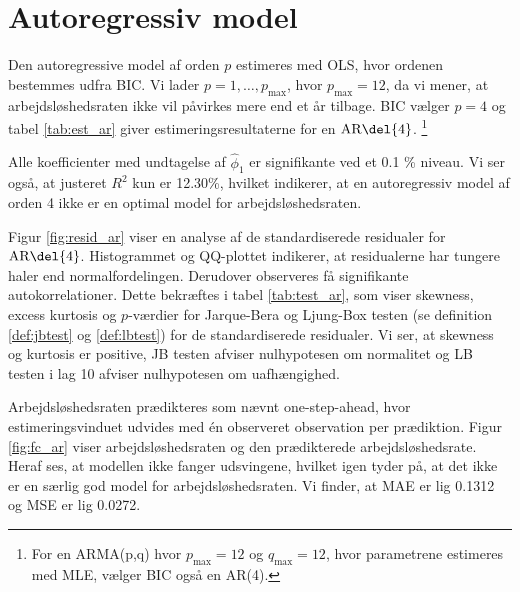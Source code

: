 \section{Autoregressiv model}
Den autoregressive model af orden \(p\) estimeres med OLS, hvor ordenen bestemmes udfra BIC.
Vi lader $p = 1, \ldots, p_{\max}$, hvor \(p_\text{max}=12\), da vi mener, at arbejdsløshedsraten ikke vil påvirkes mere end et år tilbage.
BIC vælger \(p=4\) og tabel \ref{tab:est_ar} giver estimeringsresultaterne for en \(\text{AR} \del{4}\). \footnote{For en ARMA(p,q) hvor $p_{\max} = 12$ og $q_{\max} = 12$, hvor parametrene estimeres med MLE, vælger BIC også en AR(4).}
%


Alle koefficienter med undtagelse af $\widehat\phi_1$ er signifikante ved et 0.1 \% niveau. 
Vi ser også, at justeret $R^2$ kun er 12.30\%, hvilket indikerer, at en autoregressiv model af orden 4 ikke er en optimal model for arbejdsløshedsraten. 



Figur \ref{fig:resid_ar} viser en analyse af de standardiserede residualer for \(\text{AR} \del{4}\). 
Histogrammet og QQ-plottet indikerer, at residualerne har tungere haler end normalfordelingen. 
Derudover observeres få signifikante autokorrelationer.
Dette bekræftes i tabel \ref{tab:test_ar}, som viser skewness, excess kurtosis og \(p\)-værdier for Jarque-Bera og Ljung-Box testen (se definition \ref{def:jbtest} og \ref{def:lbtest}) for de standardiserede residualer. 
Vi ser, at skewness og kurtosis er positive, JB testen afviser nulhypotesen om normalitet og LB testen i lag 10 afviser nulhypotesen om uafhængighed.

Arbejdsløshedsraten prædikteres som nævnt one-step-ahead, hvor estimeringsvinduet udvides med én observeret observation per prædiktion.
Figur \ref{fig:fc_ar} viser arbejdsløshedsraten og den prædikterede arbejdsløshedsrate. 
Heraf ses, at modellen ikke fanger udsvingene, hvilket igen tyder på, at det ikke er en særlig god model for arbejdsløshedsraten. 
Vi finder, at MAE er lig 0.1312 og MSE er lig 0.0272.
%

\newpage